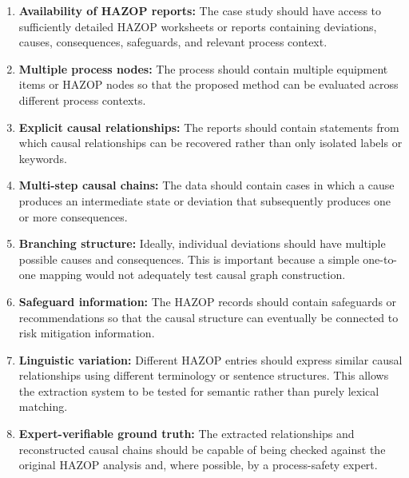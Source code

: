 \begin{enumerate}[label=\textbf{\arabic*.}]

    \item \textbf{Availability of HAZOP reports:}
    The case study should have access to sufficiently detailed HAZOP
    worksheets or reports containing deviations, causes, consequences,
    safeguards, and relevant process context.

    \item \textbf{Multiple process nodes:}
    The process should contain multiple equipment items or HAZOP nodes
    so that the proposed method can be evaluated across different
    process contexts.

    \item \textbf{Explicit causal relationships:}
    The reports should contain statements from which causal
    relationships can be recovered rather than only isolated labels
    or keywords.

    \item \textbf{Multi-step causal chains:}
    The data should contain cases in which a cause produces an
    intermediate state or deviation that subsequently produces one or
    more consequences.

    \item \textbf{Branching structure:}
    Ideally, individual deviations should have multiple possible causes
    and consequences. This is important because a simple one-to-one
    mapping would not adequately test causal graph construction.

    \item \textbf{Safeguard information:}
    The HAZOP records should contain safeguards or recommendations so
    that the causal structure can eventually be connected to risk
    mitigation information.

    \item \textbf{Linguistic variation:}
    Different HAZOP entries should express similar causal relationships
    using different terminology or sentence structures. This allows
    the extraction system to be tested for semantic rather than
    purely lexical matching.

    \item \textbf{Expert-verifiable ground truth:}
    The extracted relationships and reconstructed causal chains should
    be capable of being checked against the original HAZOP analysis
    and, where possible, by a process-safety expert.

\end{enumerate}

